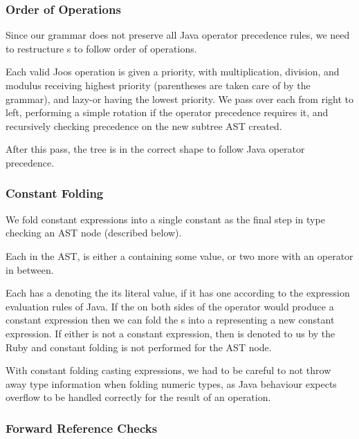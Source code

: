 \documentclass[pdftex,11pt,a4paper]{article}
\begin{document}
\subsubsection{Order of Operations}

Since our grammar does not preserve all Java operator precedence
rules, we need to restructure s to follow order of
operations.

Each valid Joos operation is given a priority, with multiplication, division,
and modulus receiving highest priority (parentheses are taken care of by the
grammar), and lazy-or having the lowest priority. We pass over each
 from right to left, performing a simple rotation if
the operator precedence requires it, and recursively checking
precedence on the new subtree AST created.

After this pass, the  tree is in the correct shape to
follow Java operator precedence.

\subsubsection{Constant Folding}

We fold constant expressions into a single constant as the final step
in type checking an AST node (described below).

Each  in the AST, is either a  containing
some value, or two more  with an 
operator in between.

Each  has a  denoting the its literal
value, if it has one according to the expression evaluation rules of
Java. If the  on both sides of the operator would
produce a constant expression then we can fold the
s into a  representing a new constant
expression. If either  is not a constant
expression, then  is denoted to us by the Ruby
 and constant folding is not performed for the AST node.

With constant folding casting expressions, we had to be careful to not
throw away type information when folding numeric types, as Java
behaviour expects overflow to be handled correctly for the result of
an operation.


\subsubsection{Forward Reference Checks}
\end{document}
